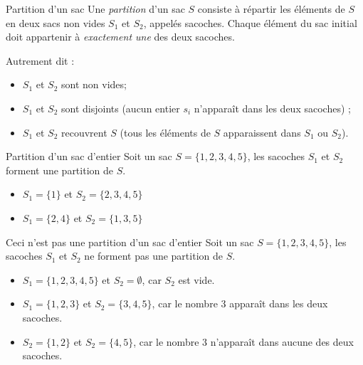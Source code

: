 \documentclass[a4paper,twoside]{article}
\begin{document}
\begin{definition}{Partition d'un sac}
  Une \emph{partition} d'un sac $S$ consiste à répartir les éléments de $S$ en deux sacs non vides $S_1$ et $S_2$, appelés sacoches.
  Chaque élément du sac initial doit appartenir à \emph{exactement une} des deux sacoches.
\end{definition}
Autrement dit :
\begin{itemize}
\item $S_1$ et $S_2$ sont non vides; %
\item $S_1$ et $S_2$ sont disjoints (aucun entier $s_i$ n'apparaît dans les deux sacoches) ; %
\item $S_1$ et $S_2$ recouvrent $S$ (tous les éléments de $S$ apparaissent dans $S_1$ ou $S_2$).
\end{itemize}
\begin{exemple}{Partition d'un sac d'entier}
  Soit un sac $S = \{1,2,3,4,5\}$, les sacoches $S_1$ et $S_2$ forment une partition de $S$.
    \begin{itemize}
    \item $S_1 = \{1\}$ et $S_2 = \{2,3,4,5\}$
    \item $S_1 = \{2, 4\}$ et $S_2 = \{1,3,5\}$
    \end{itemize}
\end{exemple}

\begin{exemple}{Ceci n'est pas une partition d'un sac d'entier}
  Soit un sac $S = \{1,2,3,4,5\}$, les sacoches $S_1$ et $S_2$ ne forment pas une partition de $S$.
    \begin{itemize}
    \item $S_1 = \{1,2,3,4,5\}$ et $S_2 = \emptyset$, car $S_2$ est vide.
    \item $S_1 = \{1,2,3\}$ et $S_2 = \{3,4,5\}$, car le nombre 3 apparaît dans les deux sacoches.
    \item $S_2 = \{1,2\}$ et $S_2 = \{4, 5\}$, car le nombre 3 n'apparaît dans aucune des deux sacoches.
    \end{itemize}
\end{exemple}
\end{document}
